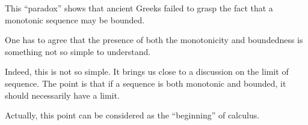 {This ``paradox'' shows that ancient Greeks failed to grasp the fact that a monotonic sequence may be bounded.

\rdr One has to agree that the presence of both the monotonicity and boundedness is something not so simple to understand.

\athr Indeed, this is not so simple. It brings us close to a discussion on the limit of sequence. The point is that if a sequence is both monotonic and bounded, it should necessarily have a limit.

Actually, this point can be considered as the ``beginning'' of calculus.
}